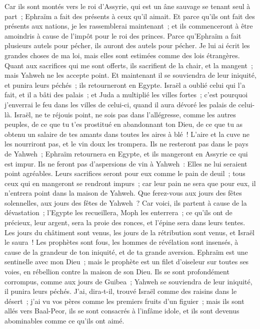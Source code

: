 \begin{multicols}{2}
Car ils sont montés vers le roi d'Assyrie, qui est un âne sauvage se tenant seul à part~; Ephraïm a fait des présents à ceux qu'il aimait.
Et parce qu'ils ont fait des présents aux nations, je les rassemblerai maintenant~; et ils commenceront à être amoindris à cause de l'impôt pour le roi des princes.
Parce qu'Ephraïm a fait plusieurs autels pour pécher, ils auront des autels pour pécher.
Je lui ai écrit les grandes choses de ma loi, mais elles sont estimées comme des lois étrangères.
Quant aux sacrifices qui me sont offerts, ils sacrifient de la chair, et la mangent~; mais Yahweh ne les accepte point. Et maintenant il se souviendra de leur iniquité, et punira leurs péchés~; ils retourneront en Egypte.
Israël a oublié celui qui l'a fait, et il a bâti des palais~; et Juda a multiplié les villes fortes~; c'est pourquoi j'enverrai le feu dans les villes de celui-ci, quand il aura dévoré les palais de celui-là.
\VerseOne{}Israël, ne te réjouis point, ne sois pas dans l'allégresse, comme les autres peuples, de ce que tu t'es prostitué en abandonnant ton Dieu, de ce que tu as obtenu un salaire de tes amants dans toutes les aires à blé~!
L'aire et la cuve ne les nourriront pas, et le vin doux les trompera.
Ils ne resteront pas dans le pays de Yahweh~; Ephraïm retournera en Egypte, et ils mangeront en Assyrie ce qui est impur.
Ils ne feront pas d'aspersions de vin à Yahweh~: Elles ne lui seraient point agréables. Leurs sacrifices seront pour eux comme le pain de deuil~; tous ceux qui en mangeront se rendront impurs~; car leur pain ne sera que pour eux, il n'entrera point dans la maison de Yahweh.
Que ferez-vous aux jours des fêtes solennelles, aux jours des fêtes de Yahweh~?
Car voici, ils partent à cause de la dévastation~; l'Egypte les recueillera, Moph les enterrera~; ce qu'ils ont de précieux, leur argent, sera la proie des ronces, et l'épine sera dans leurs tentes.
Les jours du châtiment sont venus, les jours de la rétribution sont venus, et Israël le saura~! Les prophètes sont fous, les hommes de révélation sont insensés, à cause de la grandeur de ton iniquité, et de ta grande aversion.
Ephraïm est une sentinelle avec mon Dieu~; mais le prophète est un filet d'oiseleur sur toutes ses voies, en rébellion contre la maison de son Dieu.
Ils se sont profondément corrompus, comme aux jours de Guibea~; Yahweh se souviendra de leur iniquité, il punira leurs péchés.
J'ai, dira-t-il, trouvé Israël comme des raisins dans le désert~; j'ai vu vos pères comme les premiers fruits d'un figuier~; mais ils sont allés vers Baal-Peor, ils se sont consacrés à l'infâme idole, et ils sont devenus abominables comme ce qu'ils ont aimé.

\end{multicols}
